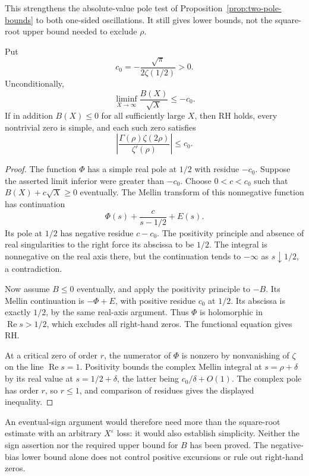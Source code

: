This strengthens the absolute-value pole test of
Proposition~\ref{prop:two-pole-bounds} to both one-sided
oscillations. It still gives lower bounds, not the square-root
upper bound needed to exclude \(\rho\).

\begin{proposition}
\label{prop:eventual-smoothed-sign}
Put
\[
 c_0=-\frac{\sqrt\pi}{2\zeta(1/2)}>0.
\]
Unconditionally,
\[
 \liminf_{X\to\infty}\frac{B(X)}{\sqrt X}\le-c_0.
\]
If in addition \(B(X)\le0\) for all sufficiently large \(X\),
then RH holds, every nontrivial zero is simple, and each such
zero satisfies
\[
 \left|\frac{\Gamma(\rho)\zeta(2\rho)}{\zeta'(\rho)}\right|
 \le c_0.
\]
\end{proposition}
\begin{proof}
The function \(\Phi\) has a simple real pole at \(1/2\)
with residue \(-c_0\). Suppose the asserted limit inferior
were greater than \(-c_0\). Choose \(0<c<c_0\) such that
\(B(X)+c\sqrt X\ge0\) eventually. The Mellin transform of
this nonnegative function has continuation
\[
 \Phi(s)+\frac c{s-1/2}+E(s).
\]
Its pole at \(1/2\) has negative residue \(c-c_0\).
The positivity principle and absence of real singularities to
the right force its abscissa to be \(1/2\). The integral is
nonnegative on the real axis there, but the continuation
tends to \(-\infty\) as \(s\downarrow1/2\), a contradiction.

Now assume \(B\le0\) eventually, and apply the positivity
principle to \(-B\). Its Mellin continuation is
\(-\Phi+E\), with positive residue \(c_0\) at \(1/2\).
Its abscissa is exactly \(1/2\), by the same real-axis
argument. Thus \(\Phi\) is holomorphic in
\(\operatorname{Re}s>1/2\), which excludes all right-hand
zeros. The functional equation gives RH.

At a critical zero of order \(r\), the numerator of \(\Phi\)
is nonzero by nonvanishing of \(\zeta\) on the line
\(\operatorname{Re}s=1\). Positivity bounds the complex
Mellin integral at \(s=\rho+\delta\) by its real value at
\(s=1/2+\delta\), the latter being \(c_0/\delta+O(1)\).
The complex pole has order \(r\), so \(r\le1\), and comparison
of residues gives the displayed inequality.
\end{proof}

An eventual-sign argument would therefore need more than the
square-root estimate with an arbitrary \(X^\varepsilon\) loss:
it would also establish simplicity. Neither the sign assertion
nor the required upper bound for \(B\) has been proved.
The negative-bias lower bound alone does not control positive
excursions or rule out right-hand zeros.

